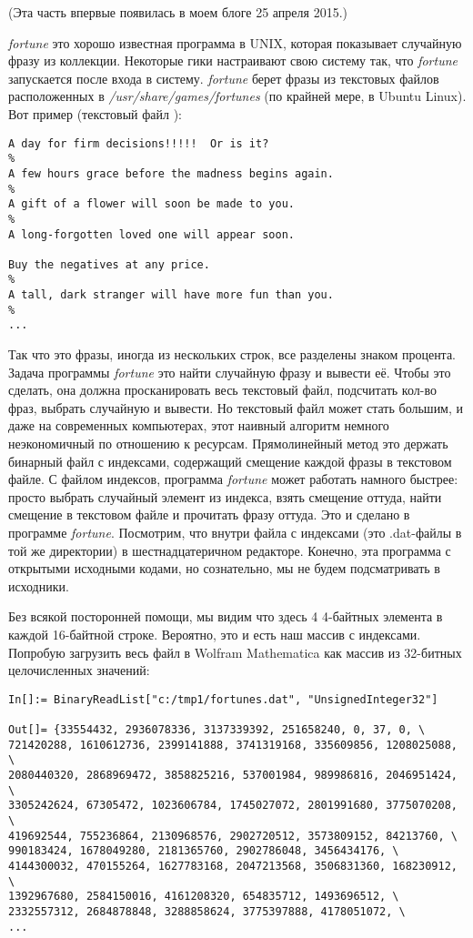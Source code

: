 
(Эта часть впервые появилась в моем блоге 25 апреля 2015.)

\emph{fortune} это хорошо известная программа в UNIX, которая показывает случайную фразу из коллекции.
Некоторые гики настраивают свою систему так, что \emph{fortune} запускается после входа в систему.
\emph{fortune} берет фразы из текстовых файлов расположенных в \emph{/usr/share/games/fortunes} (по крайней мере, в Ubuntu Linux).
Вот пример (текстовый файл ):

\begin{lstlisting}
A day for firm decisions!!!!!  Or is it?
%
A few hours grace before the madness begins again.
%
A gift of a flower will soon be made to you.
%
A long-forgotten loved one will appear soon.

Buy the negatives at any price.
%
A tall, dark stranger will have more fun than you.
%
...
\end{lstlisting}

Так что это фразы, иногда из нескольких строк, все разделены знаком процента.
Задача программы \emph{fortune} это найти случайную фразу и вывести её.
Чтобы это сделать, она должна просканировать весь текстовый файл, подсчитать кол-во фраз, выбрать случайную и вывести.
Но текстовый файл может стать большим, и даже на современных компьютерах, этот наивный алгоритм немного неэкономичный
по отношению к ресурсам.
Прямолинейный метод это держать бинарный файл с индексами, содержащий смещение каждой фразы в текстовом файле.
С файлом индексов, программа \emph{fortune} может работать намного быстрее: просто выбрать случайный элемент из индекса,
взять смещение оттуда, найти смещение в текстовом файле и прочитать фразу оттуда.
Это и сделано в программе \emph{fortune}.
Посмотрим, что внутри файла с индексами (это .dat-файлы в той же директории) в шестнадцатеричном редакторе.
Конечно, эта программа с открытыми исходными кодами, но сознательно, мы не будем подсматривать в исходники.



Без всякой посторонней помощи, мы видим что здесь 4 4-байтных элемента в каждой 16-байтной строке.
Вероятно, это и есть наш массив с индексами.
Попробую загрузить весь файл в Wolfram Mathematica как массив из 32-битных целочисленных значений:

\begin{lstlisting}[style=custommath]
In[]:= BinaryReadList["c:/tmp1/fortunes.dat", "UnsignedInteger32"]

Out[]= {33554432, 2936078336, 3137339392, 251658240, 0, 37, 0, \
721420288, 1610612736, 2399141888, 3741319168, 335609856, 1208025088, \
2080440320, 2868969472, 3858825216, 537001984, 989986816, 2046951424, \
3305242624, 67305472, 1023606784, 1745027072, 2801991680, 3775070208, \
419692544, 755236864, 2130968576, 2902720512, 3573809152, 84213760, \
990183424, 1678049280, 2181365760, 2902786048, 3456434176, \
4144300032, 470155264, 1627783168, 2047213568, 3506831360, 168230912, \
1392967680, 2584150016, 4161208320, 654835712, 1493696512, \
2332557312, 2684878848, 3288858624, 3775397888, 4178051072, \
...
\end{lstlisting}

